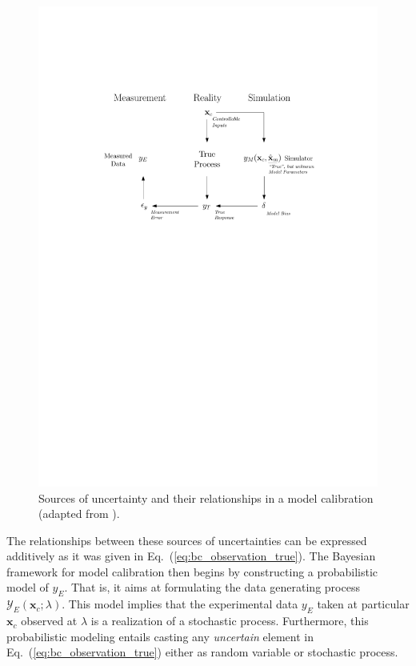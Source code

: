 \begin{figure}[bth]	
	\centering
	\includegraphics[width=1.0\textwidth]{../figures/chapter5/figures/HMErrorModel}
	\caption[Relationships between sources of uncertainty in a model calibration.]{Sources of uncertainty and their relationships in a model calibration (adapted from \cite{Huard2006}).}
	\label{fig:ch5_hm_error_model}
\end{figure}

The relationships between these sources of uncertainties can be expressed additively as it was given in Eq.~(\ref{eq:bc_observation_true}).
The Bayesian framework for model calibration then begins by constructing a probabilistic model of $y_E$. 
That is, it aims at formulating the data generating process $\mathcal{Y}_E(\bm{x}_c;\lambda)$.
This model implies that the experimental data $y_E$ taken at particular $\bm{x}_c$ observed at $\lambda$ is a realization of a stochastic process.
Furthermore, this probabilistic modeling entails casting any \emph{uncertain} element in Eq.~(\ref{eq:bc_observation_true}) either as random variable or stochastic process.

